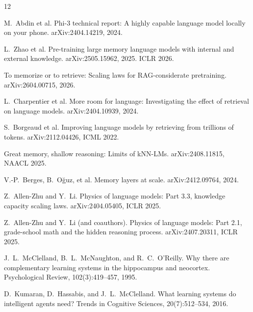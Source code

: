 \documentclass[11pt]{article}
\begin{document}
\begin{thebibliography}{12}

 M.~Abdin et al. Phi-3 technical report: A highly capable
language model locally on your phone. arXiv:2404.14219, 2024.

 L.~Zhao et al. Pre-training large memory language models
with internal and external knowledge. arXiv:2505.15962, 2025. ICLR 2026.

 To memorize or to retrieve: Scaling laws for
RAG-considerate pretraining. arXiv:2604.00715, 2026.

 L.~Charpentier et al. More room for language:
Investigating the effect of retrieval on language models.
arXiv:2404.10939, 2024.

 S.~Borgeaud et al. Improving language models by
retrieving from trillions of tokens. arXiv:2112.04426, ICML 2022.

 Great memory, shallow reasoning: Limits of kNN-LMs.
arXiv:2408.11815, NAACL 2025.

 V.-P.~Berges, B.~O\u{g}uz, et al. Memory layers at
scale. arXiv:2412.09764, 2024.

 Z.~Allen-Zhu and Y.~Li. Physics of language models:
Part 3.3, knowledge capacity scaling laws. arXiv:2404.05405, ICLR 2025.

 Z.~Allen-Zhu and Y.~Li (and coauthors). Physics of
language models: Part 2.1, grade-school math and the hidden reasoning
process. arXiv:2407.20311, ICLR 2025.

 J.~L.~McClelland, B.~L.~McNaughton, and R.~C.~O'Reilly.
Why there are complementary learning systems in the hippocampus and
neocortex. Psychological Review, 102(3):419--457, 1995.

 D.~Kumaran, D.~Hassabis, and J.~L.~McClelland. What
learning systems do intelligent agents need? Trends in Cognitive
Sciences, 20(7):512--534, 2016.

\end{thebibliography}
\end{document}
